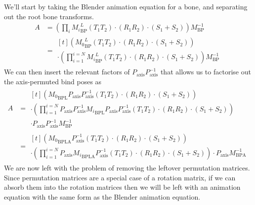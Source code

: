 \documentclass{article}
\begin{document}
We'll start by taking the Blender animation equation for a bone, and separating out the root bone transforms.
\begin{align}
A &= \left( \prod_i {M_i}^L_\mathrm{BP} \left(T_1 T_2\right) \cdot \left(R_1 R_2\right) \cdot \left(S_1 + S_2\right) \right) M_\mathrm{BP}^{-1}\\
 &= \!\begin{multlined}[t] \left( {M_0}^L_\mathrm{BP} \left(T_1 T_2\right) \cdot \left(R_1 R_2\right) \cdot \left(S_1 + S_2\right) \right)\\
 \cdot \left( \prod_{i=1}^{i=N} {M_i}^L_\mathrm{BP} \left(T_1 T_2\right) \cdot \left(R_1 R_2\right) \cdot \left(S_1 + S_2\right) \right) M_\mathrm{BP}^{-1}
\end{multlined}
\end{align}
We can then insert the relevant factors of $P_\mathrm{axis}P_\mathrm{axis}^{-1}$ that allows us to factorise out the axis-permuted bind poses as
\begin{align}
A &= \!\begin{multlined}[t] \left( {M_0}_\mathrm{BPL} P_\mathrm{axis}P_\mathrm{axis}^{-1} \left(T_1 T_2\right) \cdot \left(R_1 R_2\right) \cdot \left(S_1 + S_2\right) \right)\\
 \cdot \left( \prod_{i=1}^{i=N}  P_\mathrm{axis} P_\mathrm{axis}^{-1} {M_i}_\mathrm{BPL}  P_\mathrm{axis} P_\mathrm{axis}^{-1} \left(T_1 T_2\right) \cdot \left(R_1 R_2\right) \cdot \left(S_1 + S_2\right) \right)\\
 \cdot P_\mathrm{axis} P_\mathrm{axis}^{-1} M_\mathrm{BP}^{-1}
\end{multlined}\\
&= \!\begin{multlined}[t] \left( {M_0}_\mathrm{BPLA} P_\mathrm{axis}^{-1} \left(T_1 T_2\right) \cdot \left(R_1 R_2\right) \cdot \left(S_1 + S_2\right) \right)\\
 \cdot \left( \prod_{i=1}^{i=N}  P_\mathrm{axis} {M_i}_\mathrm{BPLA}  P_\mathrm{axis}^{-1} \left(T_1 T_2\right) \cdot \left(R_1 R_2\right) \cdot \left(S_1 + S_2\right) \right)
 \cdot P_\mathrm{axis} M_\mathrm{BPA}^{-1}
\end{multlined}
\end{align}
We are now left with the problem of removing the leftover permutation matrices. Since permutation matrices are a special case of a rotation matrix, if we can absorb them into the rotation matrices then we will be left with an animation equation with the same form as the Blender animation equation.
\end{document}
